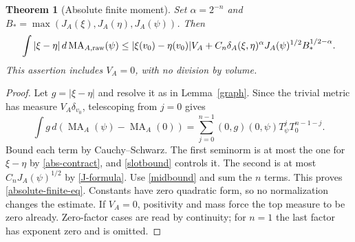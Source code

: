 \documentclass[10pt]{article}
\newtheorem{theorem}{Theorem}[section]
\newcommand{\MA}{\operatorname{MA}}
\begin{document}
\begin{theorem}[Absolute finite moment]\label{absolute-finite}
Set $\alpha=2^{-n}$ and
$B_* =\max(J_A(\xi),J_A(\eta),J_A(\psi))$.
Then
\begin{equation}\label{absolute-finite-eq}
 \int|\xi-\eta|\,d\MA_{A,\rm raw}(\psi)
 \leq |\xi(v_0)-\eta(v_0)|V_A
      +C_n\delta_A(\xi,\eta)^\alpha
         J_A(\psi)^{1/2}B_*^{1/2-\alpha}.
\end{equation}
This assertion includes $V_A=0$, with no division by volume.
\end{theorem}
\begin{proof}
Let $g=|\xi-\eta|$ and resolve it as in Lemma~\ref{graph}. Since the
trivial metric has measure $V_A\delta_{v_0}$, telescoping from $j=0$ gives
\[
 \int g\,d(\MA_A(\psi)-\MA_A(0))
  =\sum_{j=0}^{n-1}(0,g)(0,\psi)T_\psi^jT_0^{n-1-j}.
\]
Bound each term by Cauchy--Schwarz. The first seminorm is at most the
one for $\xi-\eta$ by \eqref{abs-contract}, and \eqref{slotbound}
controls it. The second is at most $C_nJ_A(\psi)^{1/2}$ by
\eqref{J-formula}. Use \eqref{midbound} and sum the $n$ terms.
This proves \eqref{absolute-finite-eq}. Constants have zero quadratic
form, so no normalization changes the estimate. If $V_A=0$, positivity
and mass force the top measure to be zero already. Zero-factor cases
are read by continuity; for $n=1$ the last factor has exponent zero
and is omitted.
\end{proof}
\end{document}
